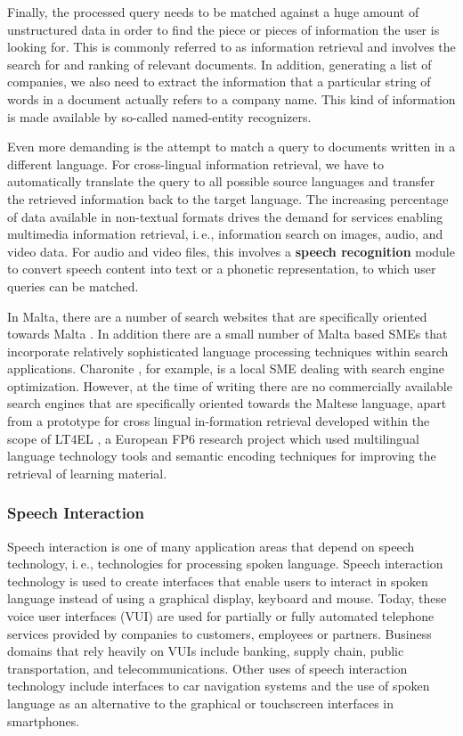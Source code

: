 \documentclass[]{../../metanetpaper}
\begin{document}
\begin{multicols}{2}
Finally, the processed query needs to be matched against a huge amount of unstructured data in order to find the piece or pieces of information the user is looking for. This is commonly referred to as information retrieval and involves the search for and ranking of relevant documents. In addition, generating a list of companies, we also need to extract the information that a particular string of words in a document actually refers to a company name. This kind of information is made available by so-called named-entity recognizers. 

Even more demanding is the attempt to match a query to documents written in a different language. For cross-lingual information retrieval, we have to automatically translate the query to all possible source languages and transfer the retrieved information back to the target language. The increasing percentage of data available in non-textual formats drives the demand for services enabling multimedia information retrieval, i.\,e., information search on images, audio, and video data. For audio and video files, this involves a \textbf{speech recognition} module to convert speech content into text or a phonetic representation, to which user queries can be matched.

In Malta, there are a number of search websites that are specifically oriented towards Malta \cite{philb1}. In addition there are a small number of Malta based SMEs that incorporate relatively sophisticated language processing techniques within search applications. Charonite \cite{charonite1}, for example, is a local SME dealing with search engine optimization. However, at the time of writing there are no commercially available search engines that are specifically oriented towards the Maltese language, apart from a prototype for cross lingual in-formation retrieval developed within the scope of LT4EL \cite{let1}, a European FP6 research project which used multilingual language technology tools and semantic encoding techniques for improving the retrieval of learning material. 

\subsubsection{Speech Interaction}

Speech interaction is one of many application areas that depend on speech technology, i.\,e., technologies for processing spoken language. Speech interaction technology is used to create interfaces that enable users to interact in spoken language instead of using a graphical display, keyboard and mouse.  Today, these voice user interfaces (VUI) are used for partially or fully automated telephone services provided by companies to customers, employees or partners. Business domains that rely heavily on VUIs include banking, supply chain, public transportation, and telecommunications. Other uses of speech interaction technology include interfaces to car navigation systems and the use of spoken language as an alternative to the graphical or touchscreen interfaces in smartphones.


\end{multicols}
\end{document}
